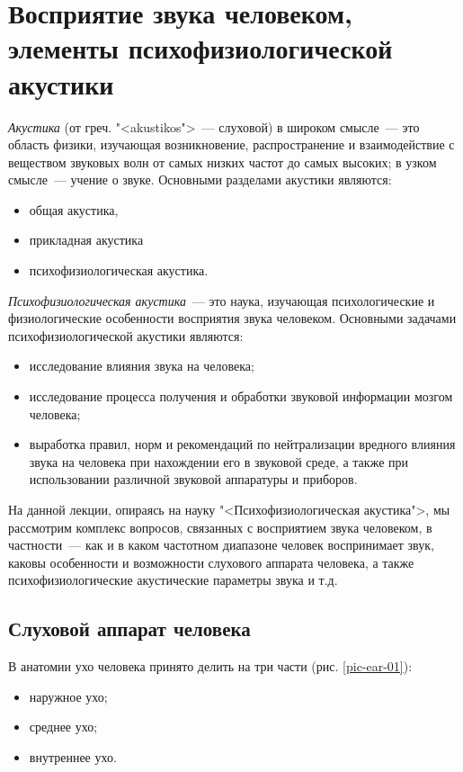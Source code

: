 \documentclass[oneside, final, 14pt]{extreport}
\begin{document}
  
\setcounter{chapter}{1}
\chapter{Восприятие звука человеком, элементы психофизиологической акустики}
{\itshape Акустика} (от греч. "<akustikos">~--- слуховой) в широком смысле~--- это область физики, изучающая возникновение, распространение и взаимодействие с веществом звуковых волн от самых низких частот до самых высоких; в узком смысле~--- учение о звуке. Основными разделами акустики являются:
\begin{itemize}
\item общая акустика, 
\item прикладная акустика 
\item психофизиологическая акустика.
\end{itemize}

{\itshape Психофизиологическая акустика}~--- это наука, изучающая психологические и физиологические особенности восприятия звука человеком. Основными задачами психофизиологической акустики являются: 
\begin{itemize}
\item исследование влияния звука на человека;
\item исследование процесса получения и обработки звуковой информации мозгом человека;
\item выработка правил, норм и рекомендаций по нейтрализации вредного влияния звука на человека при нахождении его в звуковой среде, а также при использовании различной звуковой аппаратуры и приборов.
\end{itemize} 

На данной лекции, опираясь на науку "<Психофизиологическая акустика">, мы рассмотрим комплекс вопросов, связанных с восприятием звука человеком, в частности~--- как и в каком частотном диапазоне человек воспринимает звук, каковы особенности и возможности слухового аппарата человека, а также психофизиологические акустические параметры звука и т.д. 

\section{Слуховой аппарат человека}
В анатомии ухо человека принято делить на три части (рис. \ref{pic-ear-01}): 
\begin{itemize}
\item наружное ухо;
\item среднее ухо;
\item внутреннее ухо.
\end{itemize}
\end{document}
